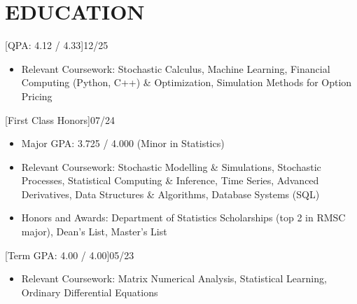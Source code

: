 \documentclass[cmu]{resume}
\begin{document}
    
    \address{160 Water Street, New York, NY 10038}
    \maketitle


    \section{EDUCATION}
    [QPA: 4.12 / 4.33]{12/25}
    \begin{itemize}
        \item Relevant Coursework: Stochastic Calculus, Machine Learning, Financial Computing (Python, C++) \& Optimization, Simulation Methods for Option Pricing
    \end{itemize}

    [First Class Honors]{07/24}
    \begin{itemize}
        \item Major GPA: 3.725 / 4.000 (Minor in Statistics)
        \item Relevant Coursework: Stochastic Modelling \& Simulations, Stochastic Processes, Statistical Computing \& Inference, Time Series, Advanced Derivatives, Data Structures \& Algorithms, Database Systems (SQL)
        \item Honors and Awards: Department of Statistics Scholarships (top 2 in RMSC major), Dean's List, Master's List
    \end{itemize}

    [Term GPA: 4.00 / 4.00]{05/23}
    \begin{itemize}
        \item Relevant Coursework: Matrix Numerical Analysis, Statistical Learning, Ordinary Differential Equations
    \end{itemize}
\end{document}
